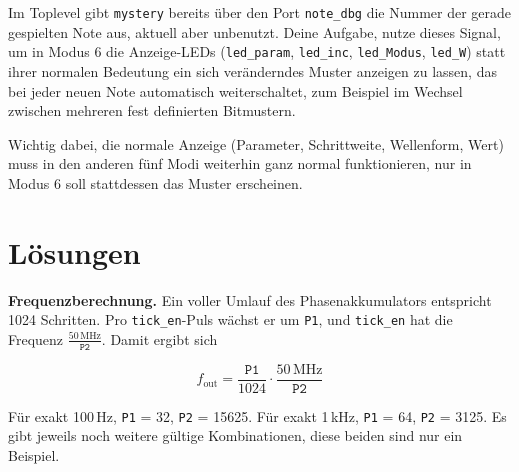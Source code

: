 Im Toplevel gibt \texttt{mystery} bereits über den Port \texttt{note\_dbg} die Nummer der gerade gespielten Note aus, aktuell aber unbenutzt. Deine Aufgabe, nutze dieses Signal, um in Modus 6 die Anzeige-LEDs (\texttt{led\_param}, \texttt{led\_inc}, \texttt{led\_Modus}, \texttt{led\_W}) statt ihrer normalen Bedeutung ein sich veränderndes Muster anzeigen zu lassen, das bei jeder neuen Note automatisch weiterschaltet, zum Beispiel im Wechsel zwischen mehreren fest definierten Bitmustern.

Wichtig dabei, die normale Anzeige (Parameter, Schrittweite, Wellenform, Wert) muss in den anderen fünf Modi weiterhin ganz normal funktionieren, nur in Modus 6 soll stattdessen das Muster erscheinen.

\section{Lösungen}

\textbf{Frequenzberechnung.} Ein voller Umlauf des Phasenakkumulators entspricht 1024 Schritten. Pro \texttt{tick\_en}-Puls wächst er um \texttt{P1}, und \texttt{tick\_en} hat die Frequenz $\frac{50\,\text{MHz}}{\texttt{P2}}$. Damit ergibt sich

\[
f_{\text{out}} = \frac{\texttt{P1}}{1024} \cdot \frac{50\,\text{MHz}}{\texttt{P2}}
\]

Für exakt 100\,Hz, \texttt{P1} = 32, \texttt{P2} = 15625. Für exakt 1\,kHz, \texttt{P1} = 64, \texttt{P2} = 3125. Es gibt jeweils noch weitere gültige Kombinationen, diese beiden sind nur ein Beispiel.
